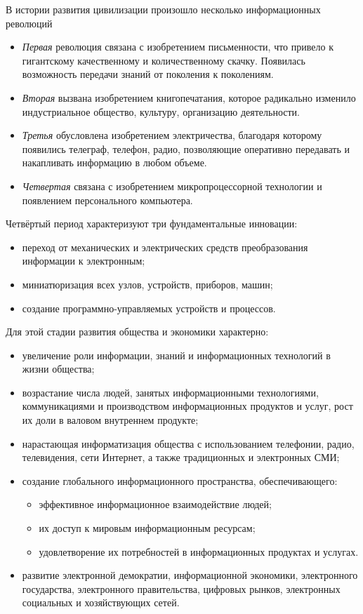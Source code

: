 
В истории развития цивилизации произошло несколько информационных революций
\begin{itemize}
    \item \emph{Первая} революция связана с изобретением письменности, что привело к гигантскому 
        качественному и количественному скачку. Появилась возможность передачи знаний от поколения к 
        поколениям.
    \item \emph{Вторая} вызвана изобретением книгопечатания, которое радикально изменило индустриальное 
        общество, культуру, организацию деятельности.
    \item \emph{Третья} обусловлена изобретением электричества, благодаря которому появились телеграф, 
        телефон, радио, позволяющие оперативно передавать и накапливать информацию в любом объеме.
    \item \emph{Четвертая} связана с изобретением микропроцессорной технологии и появлением персонального 
        компьютера.
\end{itemize}

Четвёртый период характеризуют три фундаментальные инновации:
\begin{itemize}
    \item переход от механических и электрических средств преобразования информации к электронным;
    \item миниатюризация всех узлов, устройств, приборов, машин;
    \item создание программно-управляемых устройств и процессов.
\end{itemize}

Для этой стадии развития общества и экономики характерно:
\begin{itemize}
    \item увеличение роли информации, знаний и информационных технологий в жизни общества;
    \item возрастание числа людей, занятых информационными технологиями, коммуникациями и производством 
        информационных продуктов и услуг, рост их доли в валовом внутреннем продукте;
    \item нарастающая информатизация общества с использованием телефонии, радио, телевидения, сети Интернет, 
        а также традиционных и электронных СМИ;
    \item создание глобального информационного пространства, обеспечивающего:
    \begin{itemize}
        \item эффективное информационное взаимодействие людей;
        \item их доступ к мировым информационным ресурсам;
        \item удовлетворение их потребностей в информационных продуктах и услугах.
    \end{itemize}
    \item развитие электронной демократии, информационной экономики, электронного государства, электронного 
        правительства, цифровых рынков, электронных социальных и хозяйствующих сетей.
\end{itemize}